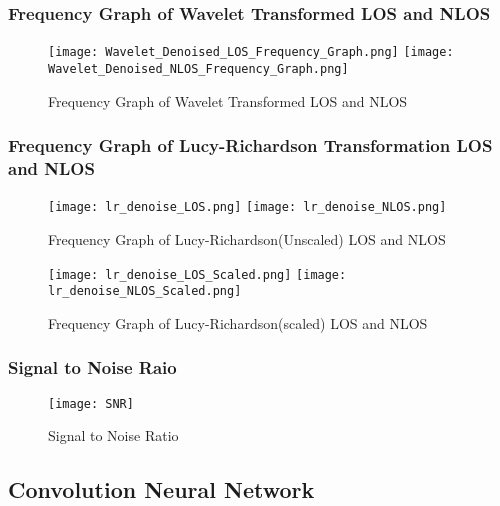 \documentclass[
	article, %
	11pt, %
	draft, %
]{CSUniSchoolLabReport}
\begin{document}
\subsubsection{Frequency Graph of Wavelet Transformed LOS and NLOS}\label{frequency_graph_wavelet}

\begin{figure}[H] 
  \centering
  \texttt{[image: Wavelet\_Denoised\_LOS\_Frequency\_Graph.png]}
  \texttt{[image: Wavelet\_Denoised\_NLOS\_Frequency\_Graph.png]}
  \caption{Frequency Graph of Wavelet Transformed LOS and NLOS}\label{fig:frequency_graph_wavelet}
\end{figure}

\subsubsection{Frequency Graph of Lucy-Richardson Transformation LOS and NLOS}\label{frequency_graph_lr}

\begin{figure}[H] 
  \centering
  \texttt{[image: lr\_denoise\_LOS.png]}
  \texttt{[image: lr\_denoise\_NLOS.png]}
  \caption{Frequency Graph of Lucy-Richardson(Unscaled) LOS and NLOS}\label{fig:frequency_graph_lr}
\end{figure}

\begin{figure}[H] 
  \centering
  \texttt{[image: lr\_denoise\_LOS\_Scaled.png]}
  \texttt{[image: lr\_denoise\_NLOS\_Scaled.png]}
  \caption{Frequency Graph of Lucy-Richardson(scaled) LOS and NLOS}\label{fig:frequency_graph_lr_scaled}
\end{figure}

\subsubsection{Signal to Noise Raio}\label{sur_visual}

\begin{figure}[H] %
	\centering %
	\texttt{[image: SNR]} %
	\caption{Signal to Noise Ratio}\label{fig:snr}
\end{figure}


\subsection{Convolution Neural Network}\label{cnn_visual}
\end{document}
